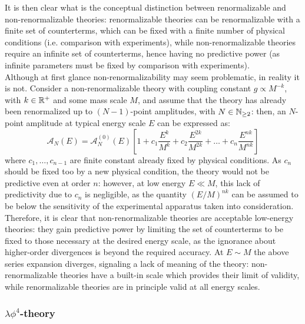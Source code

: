 It is then clear what is the conceptual distinction between renormalizable and non-renormalizable theories: renormalizable theories can be renormalizable with a finite set of counterterms, which can be fixed with a finite number of physical conditions (i.e. comparison with experiments), while non-renormalizable theories require an infinite set of counterterms, hence having no predictive power (as infinite parameters must be fixed by comparison with experiments). \\
Although at first glance non-renormalizability may seem problematic, in reality it is not. Consider a non-renormalizable theory with coupling constant $ g \propto M^{-k} $, with $ k \in \mathbb{R}^+ $ and some mass scale $ M $, and assume that the theory has already been renormalized up to $ (N - 1) $-point amplitudes, with $ N \in \mathbb{N}_{\ge 2} $: then, an $ N $-point amplitude at typical energy scale $ E $ can be expressed as:
\begin{equation*}
  \mathcal{A}_N(E) = \mathcal{A}^{(0)}_N(E) \left[ 1 + c_1 \frac{E^k}{M^k} + c_2 \frac{E^{2k}}{M^{2k}} + \dots + c_n \frac{E^{nk}}{M^{nk}} \right]
\end{equation*}
where $ c_1, \dots, c_{n-1} $ are finite constant already fixed by physical conditions. As $ c_n $ should be fixed too by a new physical condition, the theory would not be predictive even at order $ n $: however, at low energy $ E \ll M $, this lack of predictivity due to $ c_n $ is negligible, as the quantity $ (E/M)^{nk} $ can be assumed to be below the sensitivity of the experimental apparatus taken into consideration. Therefore, it is clear that non-renormalizable theories are acceptable low-energy theories: they gain predictive power by limiting the set of counterterms to be fixed to those necessary at the desired energy scale, as the ignorance about higher-order divergences is beyond the required accuracy. At $ E \sim M $ the above series expansion diverges, signaling a lack of meaning of the theory: non-renormalizable theories have a built-in scale which provides their limit of validity, while renormalizable theories are in principle valid at all energy scales.

\subsubsection{\texorpdfstring{$ \lambda \phi^4 $}{λφ4}-theory}

